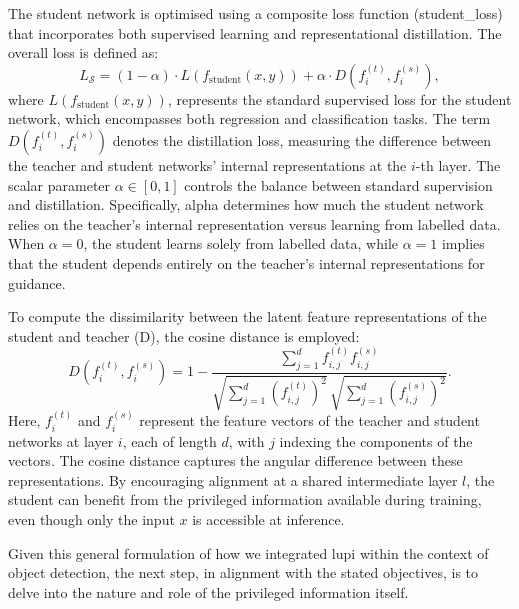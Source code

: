 The student network is optimised using a composite loss function (\gls{student_loss}) that incorporates both supervised learning and representational distillation. The overall loss is defined as:
\begin{equation} \label{eq:lupi_loss_function}
L_{\mathcal{S}} = (1 - \alpha) \cdot L(f_{\text{student}}(x, y)) + \alpha \cdot D(f_i^{(t)}, f_i^{(s)}),
\end{equation}
where \( L(f_{\text{student}}(x, y)) \), represents the standard supervised loss for the student network, which encompasses both regression and classification tasks. The term \( D(f_i^{(t)}, f_i^{(s)}) \) denotes the distillation loss, measuring the difference between the teacher and student networks' internal representations at the \( i \)-th layer. The scalar parameter \( \alpha \in [0, 1] \) controls the balance between standard supervision and distillation. Specifically, \gls{alpha} determines how much the student network relies on the teacher’s internal representation versus learning from labelled data. When \( \alpha = 0 \), the student learns solely from labelled data, while \( \alpha = 1 \) implies that the student depends entirely on the teacher's internal representations for guidance.

To compute the dissimilarity between the latent feature representations of the student and teacher (\gls{D}), the cosine distance is employed:
\begin{equation} \label{eq:cosine_distance}
D(f_i^{(t)}, f_i^{(s)}) = 1 - \frac{\sum_{j=1}^{d} f_{i,j}^{(t)} f_{i,j}^{(s)}}{\sqrt{\sum_{j=1}^{d} (f_{i,j}^{(t)})^2} \, \sqrt{\sum_{j=1}^{d} (f_{i,j}^{(s)})^2}}.
\end{equation}
Here, \( f_i^{(t)} \) and \( f_i^{(s)} \) represent the feature vectors of the teacher and student networks at layer \( i \), each of length \( d \), with \( j \) indexing the components of the vectors. The cosine distance captures the angular difference between these representations. By encouraging alignment at a shared intermediate layer \( l \), the student can benefit from the privileged information available during training, even though only the input \( x \) is accessible at inference.

Given this general formulation of how we integrated \gls{lupi} within the context of object detection, the next step, in alignment with the stated objectives, is to delve into the nature and role of the privileged information itself.


